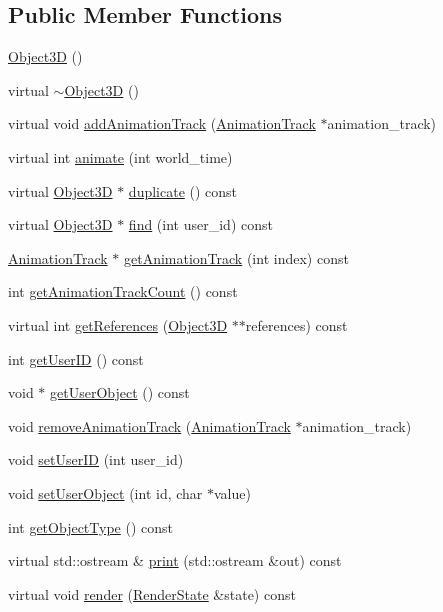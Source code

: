 \subsection*{Public Member Functions}
\begin{CompactItemize}
\item 
\hyperlink{classm3g_1_1Object3D_f4b10c33b9014a3f0a675ef4b699b773}{Object3D} ()
\item 
virtual \hyperlink{classm3g_1_1Object3D_8ece10725587e63a2c75283c16cc4df5}{$\sim$Object3D} ()
\item 
virtual void \hyperlink{classm3g_1_1Object3D_415c0b110f95410ded9b85e5d99a496b}{addAnimationTrack} (\hyperlink{classm3g_1_1AnimationTrack}{AnimationTrack} $\ast$animation\_\-track)
\item 
virtual int \hyperlink{classm3g_1_1Object3D_8aad1ceab4c2a03609c8a42324ce484d}{animate} (int world\_\-time)
\item 
virtual \hyperlink{classm3g_1_1Object3D}{Object3D} $\ast$ \hyperlink{classm3g_1_1Object3D_a25110dac934f867b83b73ad4741a0f4}{duplicate} () const 
\item 
virtual \hyperlink{classm3g_1_1Object3D}{Object3D} $\ast$ \hyperlink{classm3g_1_1Object3D_01924458161ea59220f2cc29339e2b00}{find} (int user\_\-id) const 
\item 
\hyperlink{classm3g_1_1AnimationTrack}{AnimationTrack} $\ast$ \hyperlink{classm3g_1_1Object3D_f0978f3f2efe3227ca613da3361424dd}{getAnimationTrack} (int index) const 
\item 
int \hyperlink{classm3g_1_1Object3D_0926843b66090795972850376b8e4e6c}{getAnimationTrackCount} () const 
\item 
virtual int \hyperlink{classm3g_1_1Object3D_d52d3c63076c4341b34c3631a17820e4}{getReferences} (\hyperlink{classm3g_1_1Object3D}{Object3D} $\ast$$\ast$references) const 
\item 
int \hyperlink{classm3g_1_1Object3D_b8d9067364251d0208fcdc502d394e2c}{getUserID} () const 
\item 
void $\ast$ \hyperlink{classm3g_1_1Object3D_a9b8541216c1fa7792617218a5fb6672}{getUserObject} () const 
\item 
void \hyperlink{classm3g_1_1Object3D_e36d8f8544daee6bd4e2ccd6755ed03d}{removeAnimationTrack} (\hyperlink{classm3g_1_1AnimationTrack}{AnimationTrack} $\ast$animation\_\-track)
\item 
void \hyperlink{classm3g_1_1Object3D_8eaa86665b4ca2c39691b6efc50108ee}{setUserID} (int user\_\-id)
\item 
void \hyperlink{classm3g_1_1Object3D_990adc7f146e1b5d229e1d8fc3625a24}{setUserObject} (int id, char $\ast$value)
\item 
int \hyperlink{classm3g_1_1Object3D_06be1b37b707b5f227cba2308043f3df}{getObjectType} () const 
\item 
virtual std::ostream \& \hyperlink{classm3g_1_1Object3D_6fea17fa1532df3794f8cb39cb4f911f}{print} (std::ostream \&out) const 
\item 
virtual void \hyperlink{classm3g_1_1Object3D_8babc8a79b78615da51161e94029eea9}{render} (\hyperlink{structm3g_1_1RenderState}{RenderState} \&state) const 
\end{CompactItemize}
